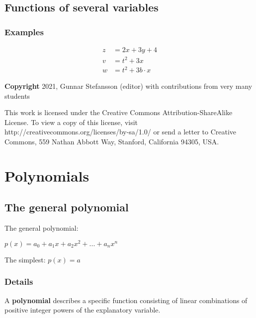 \documentclass[12pt,a4paper]{article}
\theoremstyle{regla}
\theoremstyle{remark}
\theoremstyle{definition}
\theoremstyle{nonumberbreak}
\begin{document}
\subsection{Functions of several variables}
\subsubsection{Examples}
\begin{xmpl}
\begin{align}
z &= 2x+3y+4\\
v &= t^2+3x\\
w &= t^2+3b \cdot x
\end{align}
\end{xmpl}

{\bf Copyright}
2021, Gunnar Stefansson (editor) with contributions from very many students

This work is licensed under the Creative Commons
Attribution-ShareAlike License. To view a copy of this license, visit
http://creativecommons.org/licenses/by-sa/1.0/ or send a letter to
Creative Commons, 559 Nathan Abbott Way, Stanford, California 94305,
USA.
\clearpage
\section{Polynomials}
\subsection{The general polynomial}
\begin{fbox}
\begin{minipage}{0.97\textwidth}
The general polynomial:
 
$p(x)=a_{0}+a_{1}x+a_{2}x^{2}+...+a_{n}x^{n}$

The simplest:
$p(x)=a$
\end{minipage}
\end{fbox}
\subsubsection{Details}
\begin{defn}
A {\bf polynomial} describes a specific function consisting of linear combinations of positive integer powers of the explanatory variable. 
\end{defn}
\end{document}
